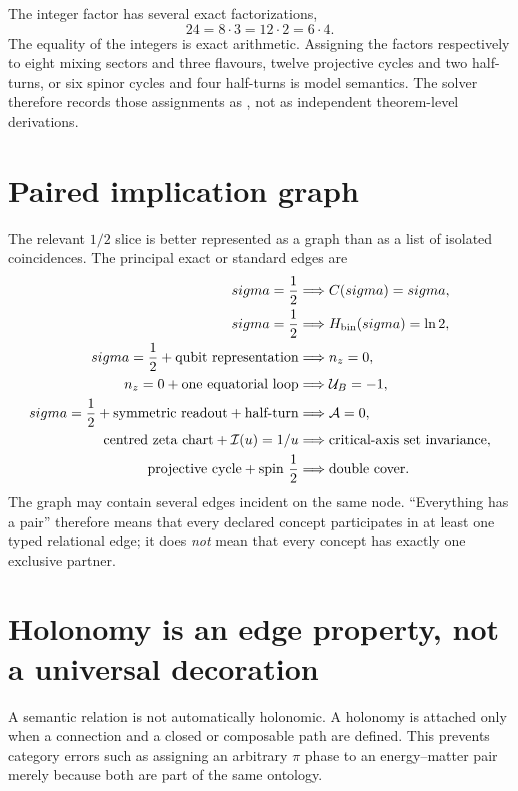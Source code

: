 The integer factor has several exact factorizations,
\begin{equation}
24=8\cdot3=12\cdot2=6\cdot4.
\label{eq:24-cross-factorization}
\end{equation}
The equality of the integers is exact arithmetic.  Assigning the factors respectively to eight mixing sectors and three flavours, twelve projective cycles and two half-turns, or six spinor cycles and four half-turns is model semantics.  The solver therefore records those assignments as , not as independent theorem-level derivations.

\section{Paired implication graph}
The relevant $1/2$ slice is better represented as a graph than as a list of isolated coincidences.  The principal exact or standard edges are
\begin{align}
\sigma=\frac12
&\Longrightarrow C(\sigma)=\sigma,\\
\sigma=\frac12
&\Longrightarrow H_{\rm bin}(\sigma)=\ln2,\\
\sigma=\frac12+\text{qubit representation}
&\Longrightarrow n_z=0,\\
n_z=0+\text{one equatorial loop}
&\Longrightarrow \mathcal U_B=-1,\\
\sigma=\frac12+\text{symmetric readout}+\text{half-turn}
&\Longrightarrow \mathcal A=0,\\
\text{centred zeta chart}+\mathcal I(u)=1/u
&\Longrightarrow \text{critical-axis set invariance},\\
\text{projective cycle}+\text{spin }\frac12
&\Longrightarrow \text{double cover}.
\end{align}
The graph may contain several edges incident on the same node.  ``Everything has a pair'' therefore means that every declared concept participates in at least one typed relational edge; it does \emph{not} mean that every concept has exactly one exclusive partner.

\section{Holonomy is an edge property, not a universal decoration}
A semantic relation is not automatically holonomic.  A holonomy is attached only when a connection and a closed or composable path are defined.  This prevents category errors such as assigning an arbitrary $\pi$ phase to an energy--matter pair merely because both are part of the same ontology.

